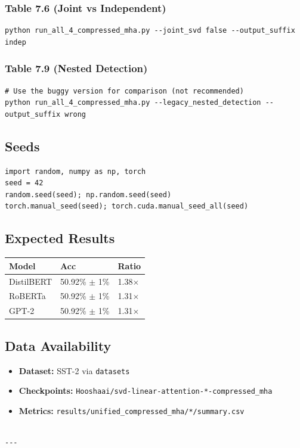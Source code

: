 \subsubsection{Table 7.6 (Joint vs Independent)}
\begin{lstlisting}
python run_all_4_compressed_mha.py --joint_svd false --output_suffix indep
\end{lstlisting}

\subsubsection{Table 7.9 (Nested Detection)}
\begin{lstlisting}
# Use the buggy version for comparison (not recommended)
python run_all_4_compressed_mha.py --legacy_nested_detection --output_suffix wrong
\end{lstlisting}

\subsection{Seeds}

\begin{lstlisting}
import random, numpy as np, torch
seed = 42
random.seed(seed); np.random.seed(seed)
torch.manual_seed(seed); torch.cuda.manual_seed_all(seed)
\end{lstlisting}

\subsection{Expected Results}

\begin{table}[H]
\centering
\small
\begin{tabular}{lll}
\toprule
\textbf{Model} & \textbf{Acc} & \textbf{Ratio} \\
\midrule
DistilBERT & 50.92\% $\pm$ 1\% & 1.38$\times$ \\
RoBERTa & 50.92\% $\pm$ 1\% & 1.31$\times$ \\
GPT-2 & 50.92\% $\pm$ 1\% & 1.31$\times$ \\
\bottomrule
\end{tabular}
\end{table}

\subsection{Data Availability}

\begin{itemize}
\item \textbf{Dataset:} SST-2 via \texttt{datasets}
\item \textbf{Checkpoints:} \texttt{Hooshaai/svd-linear-attention-*-compressed\_mha}
\item \textbf{Metrics:} \texttt{results/unified\_compressed\_mha/*/summary.csv}
\end{itemize}
\begin{lstlisting}

---
\end{lstlisting}

